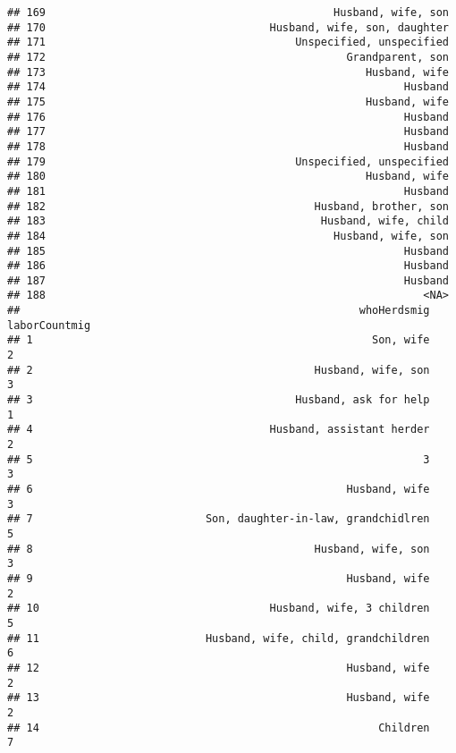 \documentclass[
]{article}
\begin{document}
\begin{verbatim}
## 169                                             Husband, wife, son
## 170                                   Husband, wife, son, daughter
## 171                                       Unspecified, unspecified
## 172                                               Grandparent, son
## 173                                                  Husband, wife
## 174                                                        Husband
## 175                                                  Husband, wife
## 176                                                        Husband
## 177                                                        Husband
## 178                                                        Husband
## 179                                       Unspecified, unspecified
## 180                                                  Husband, wife
## 181                                                        Husband
## 182                                          Husband, brother, son
## 183                                           Husband, wife, child
## 184                                             Husband, wife, son
## 185                                                        Husband
## 186                                                        Husband
## 187                                                        Husband
## 188                                                           <NA>
##                                                     whoHerdsmig laborCountmig
## 1                                                     Son, wife             2
## 2                                            Husband, wife, son             3
## 3                                         Husband, ask for help             1
## 4                                     Husband, assistant herder             2
## 5                                                             3             3
## 6                                                 Husband, wife             3
## 7                           Son, daughter-in-law, grandchidlren             5
## 8                                            Husband, wife, son             3
## 9                                                 Husband, wife             2
## 10                                    Husband, wife, 3 children             5
## 11                          Husband, wife, child, grandchildren             6
## 12                                                Husband, wife             2
## 13                                                Husband, wife             2
## 14                                                     Children             7

\end{verbatim}
\end{document}
